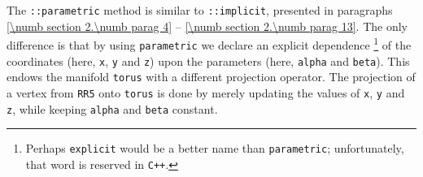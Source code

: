 The {\small\tt {}::parametric} method is similar to {\small\tt {}::implicit},
presented in paragraphs \ref{\numb section 2.\numb parag 4} --
\ref{\numb section 2.\numb parag 13}.
The only difference is that by using {\small\tt parametric} we declare an explicit dependence%
\footnote {Perhaps {\small\tt explicit} would be a better name than {\small\tt parametric};
unfortunately, that word is reserved in {\small\tt C++}.}
of the coordinates (here, {\small\tt x}, {\small\tt y} and {\small\tt z}) upon the parameters
(here, {\small\tt alpha} and {\small\tt beta}).
This endows the manifold {\small\tt torus} with a different projection operator.
The projection of a vertex from {\small\tt RR5} onto {\small\tt torus} is done by merely updating
the values of {\small\tt x}, {\small\tt y} and {\small\tt z}, while keeping {\small\tt alpha} and
{\small\tt beta} constant.
